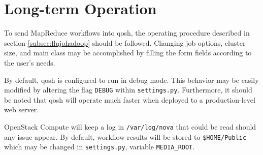 \section{Long-term Operation}\label{sec:explotacionqosh}
\noindent To send MapReduce workflows into qosh, the operating procedure described in section \ref{subsec:flujohadoop} should be followed. Changing job options, cluster size, and main class may be accomplished by filling the form fields according to the user's needs.

By default, qosh is configured to run in debug mode. This behavior may be easily modified by altering the flag \texttt{DEBUG} within \texttt{settings.py}. Furthermore, it should be noted that qosh will operate much faster when deployed to a production-level web server.

OpenStack Compute will keep a log in \texttt{/var/log/nova} that could be read should any issue appear. By default, workflow results will be stored to \texttt{\$HOME/Public} which may be changed in \texttt{settings.py}, variable \texttt{MEDIA\_ROOT}.
